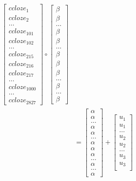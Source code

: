 \documentclass[12pt,]{krantz}
\theoremstyle{definition}
\theoremstyle{definition}
\theoremstyle{definition}
\theoremstyle{remark}
\begin{document}
\begin{equation}
\begin{aligned}
\begin{bmatrix}
ccloze_1 \\
ccloze_2 \\
\ldots \\
ccloze_{101} \\
ccloze_{102} \\
\ldots \\
ccloze_{215} \\
ccloze_{216} \\
ccloze_{217} \\
\ldots \\
ccloze_{1000} \\
\ldots \\
ccloze_{2827}
\end{bmatrix}
\circ
\begin{bmatrix}
\beta \\
\beta \\
\ldots \\
\beta \\
\beta \\
\ldots \\
\beta \\
\beta \\
\beta \\
\ldots \\
\beta \\
\ldots \\
\beta
\end{bmatrix} \\
& =
\begin{bmatrix}
\alpha \\
\alpha \\
\ldots \\
\alpha \\
\alpha \\
\ldots \\
\alpha \\
\alpha \\
\alpha \\
\ldots \\
\alpha \\
\ldots \\
\alpha
\end{bmatrix}
+
\begin{bmatrix}
u_{1} \\
u_{1} \\
\ldots \\
u_{2} \\
u_{2} \\
\ldots \\
u_{3} \\
u_{3} \\

\end{bmatrix}
\end{aligned}
\end{equation}
\end{document}
